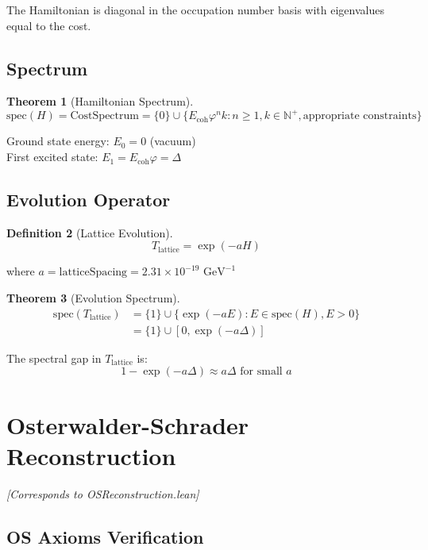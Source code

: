 \documentclass[11pt]{article}
\numberwithin{equation}{section}
\newtheorem{theorem}{Theorem}[section]
\newtheorem{definition}[theorem]{Definition}
\theoremstyle{remark}
\newcommand{\Ecoh}{E_{\text{coh}}}
\newcommand{\massGap}{\Delta}
\newcommand{\N}{\mathbb{N}}
\begin{document}
The Hamiltonian is diagonal in the occupation number basis with eigenvalues equal to the cost.

\subsection{Spectrum}

\begin{theorem}[Hamiltonian Spectrum]
\[\text{spec}(H) = \text{CostSpectrum} = \{0\} \cup \{\Ecoh \varphi^n k : n \geq 1, k \in \N^+, \text{appropriate constraints}\}\]
\end{theorem}

Ground state energy: $E_0 = 0$ (vacuum)\\
First excited state: $E_1 = \Ecoh \varphi = \massGap$

\subsection{Evolution Operator}

\begin{definition}[Lattice Evolution]
\[T_{\text{lattice}} = \exp(-a H)\]
\end{definition}

where $a = \text{latticeSpacing} = 2.31 \times 10^{-19} \text{ GeV}^{-1}$

\begin{theorem}[Evolution Spectrum]
\begin{align}
\text{spec}(T_{\text{lattice}}) &= \{1\} \cup \{\exp(-a E) : E \in \text{spec}(H), E > 0\}\\
&= \{1\} \cup [0, \exp(-a \massGap)]
\end{align}
\end{theorem}

The spectral gap in $T_{\text{lattice}}$ is:
\[1 - \exp(-a \massGap) \approx a \massGap \text{ for small } a\]

\section{Osterwalder-Schrader Reconstruction}
\textit{[Corresponds to OSReconstruction.lean]}

\subsection{OS Axioms Verification}
\end{document}
